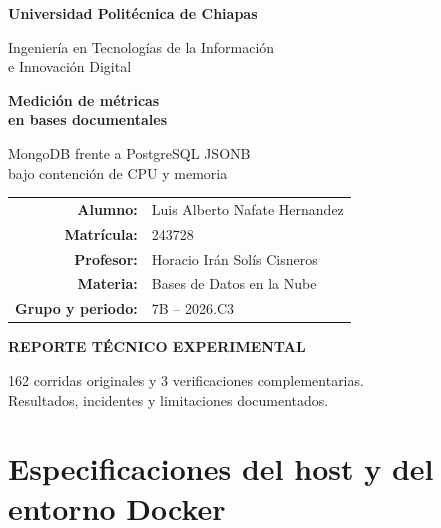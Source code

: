 \documentclass[11pt,letterpaper]{article}
\begin{document}
\begin{titlepage}\centering
{\Large\bfseries Universidad Politécnica de Chiapas\par}\vspace{.5cm}
{\large Ingeniería en Tecnologías de la Información\\e Innovación Digital\par}
\vspace{2cm}
{\Huge\bfseries\color{navy} Medición de métricas\\en bases documentales\par}\vspace{.7cm}
{\Large MongoDB frente a PostgreSQL JSONB\\bajo contención de CPU y memoria\par}
\vspace{1.1cm}{\large Evaluación 2026.C3.EVA02\par}
\vspace{1.4cm}
\begin{tabular}{rl}
\textbf{Alumno:}&Luis Alberto Nafate Hernandez\\[5pt]
\textbf{Matrícula:}&243728\\[5pt]
\textbf{Profesor:}&Horacio Irán Solís Cisneros\\[5pt]
\textbf{Materia:}&Bases de Datos en la Nube\\[5pt]
\textbf{Grupo y periodo:}&7B -- 2026.C3
\end{tabular}
\vfill
{\large\bfseries REPORTE TÉCNICO EXPERIMENTAL\par}\vspace{.3cm}
{\small 162 corridas originales y 3 verificaciones complementarias.\\Resultados, incidentes y limitaciones documentados.\par}
\vspace{.5cm}{1 de noviembre de 2026\par}
\end{titlepage}
\tableofcontents\clearpage{}
\section{Especificaciones del host y del entorno Docker}
\end{document}
